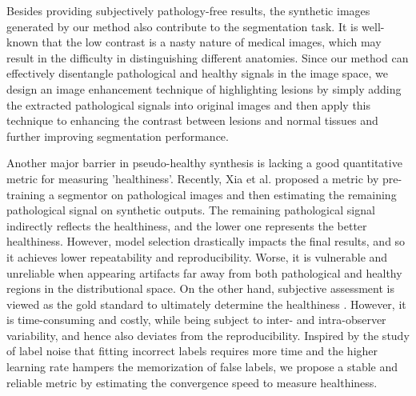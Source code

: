 \documentclass[journal,twoside,web]{ieeecolor}
\begin{document}


Besides providing subjectively pathology-free results, the synthetic images generated by our method also contribute to the segmentation task. It is well-known that the low contrast is a nasty nature of medical images, which may result in the difficulty in distinguishing different anatomies. Since our method can effectively disentangle pathological and healthy signals in the image space, we design an image enhancement technique of highlighting lesions by simply adding the extracted pathological signals into original images and then apply this technique to enhancing the contrast between lesions and normal tissues and further improving segmentation performance. 

Another major barrier in pseudo-healthy synthesis is lacking a good quantitative metric for measuring 'healthiness'. Recently, Xia et al. \cite{xia2020pseudo} proposed a metric by pre-training a segmentor on pathological images and then estimating the remaining pathological signal on synthetic outputs. The remaining pathological signal indirectly reflects the healthiness, and the lower one represents the better healthiness. However, model selection drastically impacts the final results, and so it achieves lower repeatability and reproducibility. Worse, it is vulnerable and unreliable when appearing artifacts far away from both pathological and healthy regions in the distributional space. On the other hand, subjective assessment is viewed as the gold standard to ultimately determine the healthiness \cite{xia2020pseudo}. However, it is time-consuming and costly, while being subject to inter- and intra-observer variability, and hence also deviates from the reproducibility. Inspired by the study of label noise that fitting incorrect labels requires more time \cite{zhang2016understanding} and the higher learning rate hampers the memorization of false labels, we propose a stable and reliable metric by estimating the convergence speed to measure healthiness.
\end{document}
